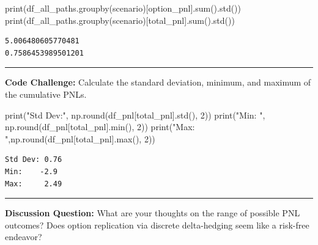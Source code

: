\documentclass[
  letterpaper,
  DIV=11,
  numbers=noendperiod]{scrreprt}
\newenvironment{Shaded}{\begin{snugshade}}{\end{snugshade}}
\newcommand{\BuiltInTok}[1]{\textcolor[rgb]{0.00,0.23,0.31}{#1}}
\newcommand{\DecValTok}[1]{\textcolor[rgb]{0.68,0.00,0.00}{#1}}
\newcommand{\NormalTok}[1]{\textcolor[rgb]{0.00,0.23,0.31}{#1}}
\newcommand{\StringTok}[1]{\textcolor[rgb]{0.13,0.47,0.30}{#1}}
\begin{document}
\begin{Shaded}
\begin{Highlighting}[]
\BuiltInTok{print}\NormalTok{(df\_all\_paths.groupby(}\StringTok{\textquotesingle{}scenario\textquotesingle{}}\NormalTok{)[}\StringTok{\textquotesingle{}option\_pnl\textquotesingle{}}\NormalTok{].}\BuiltInTok{sum}\NormalTok{().std())}
\BuiltInTok{print}\NormalTok{(df\_all\_paths.groupby(}\StringTok{\textquotesingle{}scenario\textquotesingle{}}\NormalTok{)[}\StringTok{\textquotesingle{}total\_pnl\textquotesingle{}}\NormalTok{].}\BuiltInTok{sum}\NormalTok{().std())}
\end{Highlighting}
\end{Shaded}

\begin{verbatim}
5.006480605770481
0.7586453989501201
\end{verbatim}

\begin{center}\rule{0.5\linewidth}{0.5pt}\end{center}

\textbf{Code Challenge:} Calculate the standard deviation, minimum, and
maximum of the cumulative PNLs.

\begin{Shaded}
\begin{Highlighting}[]
\BuiltInTok{print}\NormalTok{(}\StringTok{"Std Dev:"}\NormalTok{, np.}\BuiltInTok{round}\NormalTok{(df\_pnl[}\StringTok{\textquotesingle{}total\_pnl\textquotesingle{}}\NormalTok{].std(), }\DecValTok{2}\NormalTok{))}
\BuiltInTok{print}\NormalTok{(}\StringTok{"Min:   "}\NormalTok{, np.}\BuiltInTok{round}\NormalTok{(df\_pnl[}\StringTok{\textquotesingle{}total\_pnl\textquotesingle{}}\NormalTok{].}\BuiltInTok{min}\NormalTok{(), }\DecValTok{2}\NormalTok{))}
\BuiltInTok{print}\NormalTok{(}\StringTok{"Max:    "}\NormalTok{,np.}\BuiltInTok{round}\NormalTok{(df\_pnl[}\StringTok{\textquotesingle{}total\_pnl\textquotesingle{}}\NormalTok{].}\BuiltInTok{max}\NormalTok{(), }\DecValTok{2}\NormalTok{))}
\end{Highlighting}
\end{Shaded}

\begin{verbatim}
Std Dev: 0.76
Min:    -2.9
Max:     2.49
\end{verbatim}

\begin{center}\rule{0.5\linewidth}{0.5pt}\end{center}

\textbf{Discussion Question:} What are your thoughts on the range of
possible PNL outcomes? Does option replication via discrete
delta-hedging seem like a risk-free endeavor?
\end{document}
